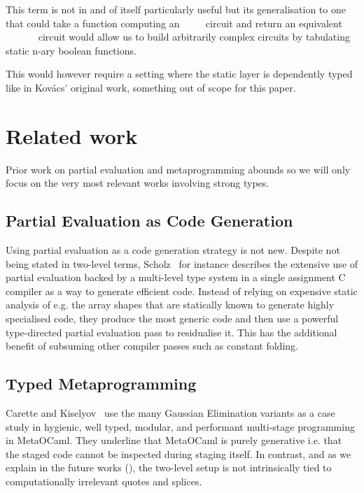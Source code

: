 This term is not in and of itself particularly useful but its
generalisation to one that could take a function computing an
{~~~~} circuit and return an
equivalent {~~\AF{+}~~~~}
circuit would allow us to build arbitrarily complex circuits
by tabulating static n-ary boolean functions.

This would however require a setting where the static layer is
dependently typed like in Kov{\'{a}}cs' original work, something
out of scope for this paper.

\section{Related work}

Prior work on partial evaluation and metaprogramming
abounds so we will only focus on the very most relevant
works involving strong types.

\subsection{Partial Evaluation as Code Generation}

Using partial evaluation as a code generation strategy
is not new. Despite not being stated in two-level terms,
Scholz~\cite{DBLP:conf/pepm/Scholz14} for instance
describes the extensive use of partial evaluation backed
by a multi-level type system in a single assignment C
compiler as a way to generate efficient code.
%
Instead of relying on expensive static analysis of e.g.
the array shapes that are statically known to generate
highly specialised code, they produce the most generic
code and then use a powerful type-directed partial
evaluation pass to residualise it.
%
This has the additional benefit of subsuming other
compiler passes such as constant folding.

\subsection{Typed Metaprogramming}

Carette and Kiselyov~\cite{DBLP:journals/scp/CaretteK11}
use the many Gaussian Elimination variants as a case study
in hygienic, well typed, modular, and performant multi-stage
programming in MetaOCaml.
%
They underline that MetaOCaml is purely generative i.e.
that the staged code cannot be inspected during staging
itself.
%
In contrast, and as we explain in the future works
(), the two-level setup is not
intrinsically tied to computationally irrelevant quotes
and splices.

